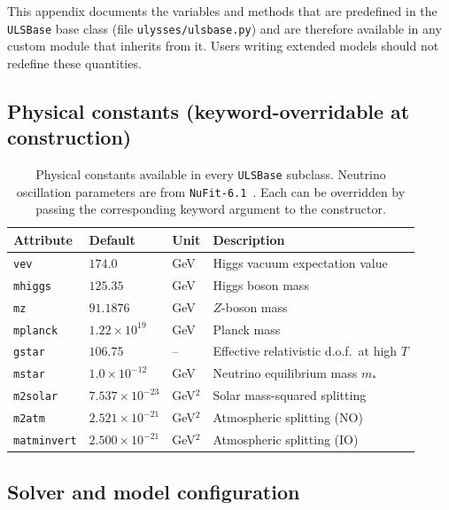 \documentclass[12pt, a4paper]{article}
\begin{document}
This appendix documents the variables and methods that are predefined in the \texttt{ULSBase}
base class (file \texttt{ulysses/ulsbase.py}) and are therefore available in any custom module
that inherits from it. Users writing extended models should not redefine these quantities.

\newpage
\subsection*{Physical constants (keyword-overridable at construction)}

\begin{table}[h!]
\centering\small
\renewcommand{\arraystretch}{1.25}
\begin{tabular}{p{4.0cm} p{2.8cm} p{1.4cm} p{5.8cm}}
\hline
\textbf{Attribute} & \textbf{Default} & \textbf{Unit} & \textbf{Description} \\
\hline
\texttt{vev}                    & $174.0$               & GeV     & Higgs vacuum expectation value \\
\texttt{mhiggs}                   & $125.35$              & GeV     & Higgs boson mass \\
\texttt{mz}                   & $91.1876$             & GeV     & $Z$-boson mass \\
\texttt{mplanck}                   & $1.22\times10^{19}$   & GeV     & Planck mass \\
\texttt{gstar}                & $106.75$              & --      & Effective relativistic d.o.f.\ at high $T$ \\
\texttt{mstar}                & $1.0\times10^{-12}$   & GeV     & Neutrino equilibrium mass $m_*$ \\
\texttt{m2solar}       & $7.537\times10^{-23}$ & GeV$^2$ & Solar mass-squared splitting \\
\texttt{m2atm}& $2.521\times10^{-21}$ & GeV$^2$ & Atmospheric splitting (NO) \\
\texttt{matminvert}& $2.500\times10^{-21}$ & GeV$^2$ & Atmospheric splitting (IO) \\
\hline
\end{tabular}
\caption{Physical constants available in every \texttt{ULSBase} subclass. Neutrino oscillation
parameters are from \texttt{NuFit-6.1}~\cite{Esteban:2024eli}. Each can be overridden by passing
the corresponding keyword argument to the constructor.}
\label{tab:ulsbase_constants}
\end{table}

\subsection*{Solver and model configuration}
\end{document}
